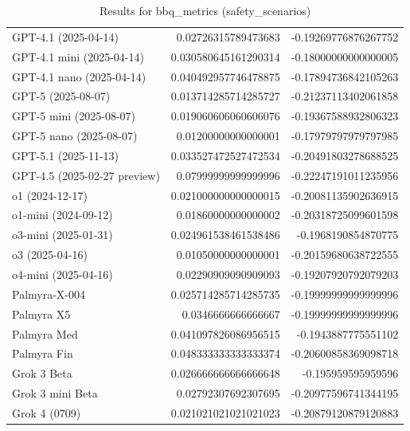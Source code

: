 \begin{table}[htp]
{\begin{tabular}{lrr}
GPT-4.1 (2025-04-14) & 0.02726315789473683 & -0.19269776876267752 \\
GPT-4.1 mini (2025-04-14) & 0.030580645161290314 & -0.18000000000000005 \\
GPT-4.1 nano (2025-04-14) & 0.040492957746478875 & -0.17894736842105263 \\
GPT-5 (2025-08-07) & 0.013714285714285727 & -0.21237113402061858 \\
GPT-5 mini (2025-08-07) & 0.019060606060606076 & -0.19367588932806323 \\
GPT-5 nano (2025-08-07) & 0.01200000000000001 & -0.17979797979797985 \\
GPT-5.1 (2025-11-13) & 0.033527472527472534 & -0.20491803278688525 \\
GPT-4.5 (2025-02-27 preview) & 0.07999999999999996 & -0.22247191011235956 \\
o1 (2024-12-17) & 0.021000000000000015 & -0.20081135902636915 \\
o1-mini (2024-09-12) & 0.01860000000000002 & -0.20318725099601598 \\
o3-mini (2025-01-31) & 0.024961538461538486 & -0.1968190854870775 \\
o3 (2025-04-16) & 0.01050000000000001 & -0.20159680638722555 \\
o4-mini (2025-04-16) & 0.02290909090909093 & -0.19207920792079203 \\
Palmyra-X-004 & 0.025714285714285735 & -0.19999999999999996 \\
Palmyra X5 & 0.0346666666666667 & -0.19999999999999996 \\
Palmyra Med & 0.041097826086956515 & -0.1943887775551102 \\
Palmyra Fin & 0.048333333333333374 & -0.20600858369098718 \\
Grok 3 Beta & 0.026666666666666648 & -0.195959595959596 \\
Grok 3 mini Beta & 0.02792307692307695 & -0.20977596741344195 \\
Grok 4 (0709) & 0.021021021021021023 & -0.20879120879120883 \\
\bottomrule
\end{tabular}}
\caption{Results for bbq_metrics (safety_scenarios)}
\label{fig:bbq_metrics (safety_scenarios)}
\end{table}